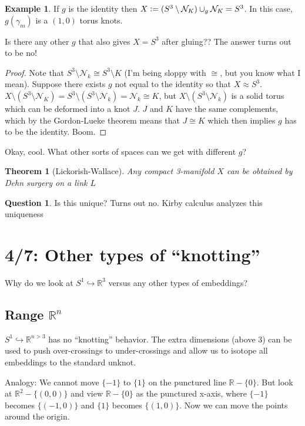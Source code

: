 \documentclass[11pt]{article}
\newcommand{\R}{\mathbb{R}}
\newcommand{\NN}{\mathcal{N}}
\newcommand{\defeq}{\vcentcolon=}
\theoremstyle{plain}
\newtheorem{thm}{Theorem}
\theoremstyle{definition}
\newtheorem{ex}{Example}
\newtheorem{question}{Question}
\begin{document}
\begin{ex}
If $g$ is the identity then $X \defeq (S^3 \setminus \NN_K) \cup_g \NN_K = S^3$. In this case, $g(\gamma_m)$ is a $(1, 0)$ torus knots.
\end{ex}

Is there any other $g$ that also gives $X = S^3$ after gluing?? The answer turns out to be no!


\begin{proof}
Note that $S^3 \setminus \NN_k \cong S^3 \setminus K$ (I'm being sloppy with $\cong$, but you know what I  mean). Suppose there exists $g$ not equal to the identity so that $X \approx S^3$.
$X \setminus (S^3 \setminus \NN_K) = S^3 \setminus (S^3 \setminus \NN_k) = \NN_k \cong K$, but $X \setminus (S^3 \setminus  \NN_k)$ is a solid torus which can be deformed into a knot $J$.
$J$ and $K$ have the same complements, which by the Gordon-Lueke theorem means that $J \cong K$ which then implies $g$ has to be the identity. Boom.
\end{proof}

Okay, cool. What other sorts of spaces can we get with different $g$?

\begin{thm}[Lickorish-Wallace]
  Any compact 3-manifold $X$ can be obtained by Dehn surgery on a link $L$
\end{thm}

\begin{question}
  Is this unique? Turns out no. Kirby calculus analyzes this uniqueness
\end{question}


\clearpage
\section{4/7: Other types of ``knotting''}

Why do we look at $S^1\hookrightarrow\R^3$ versus any other types of embeddings?


\subsection{Range $\R^n$}

$S^1\hookrightarrow\R^{n>3}$ has no ``knotting'' behavior. The extra dimensions (above 3) can be used to push over-crossings to under-crossings and allow us to isotope all embeddings to the standard unknot.

Analogy: We cannot move $\lbrace-1\rbrace$ to $\lbrace 1\rbrace$ on the punctured line $\R-\lbrace0\rbrace$. But look at $\R^2-\lbrace(0,0)\rbrace$ and view $\R-\lbrace0\rbrace$ as the punctured x-axis, where $\lbrace-1\rbrace$ becomes $\lbrace(-1,0)\rbrace$ and $\lbrace1\rbrace$ becomes $\lbrace(1,0)\rbrace$. Now we can move the points around the origin.
\end{document}
